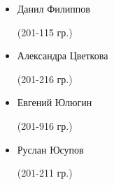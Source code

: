 \begin{multicols}{2}
\begin{small}
\begin{itemize}
	\item[] Данил Филиппов\begin{tiny} (201-115 гр.)\end{tiny}
	\item[] Александра Цветкова\begin{tiny} (201-216 гр.)\end{tiny}
	\item[] Евгений Юлюгин\begin{tiny} (201-916 гр.)\end{tiny}
	\item[] Руслан Юсупов\begin{tiny} (201-211 гр.)\end{tiny}
\end{itemize}
\end{small}
\end{multicols}
